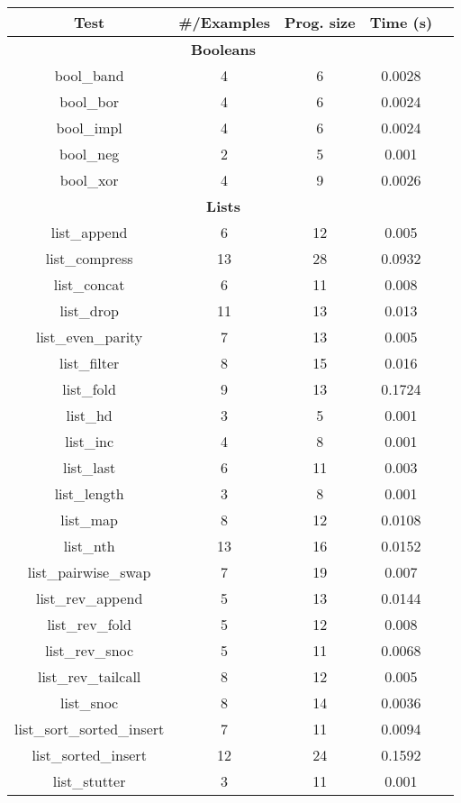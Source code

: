 \newcommand{\benchmarksCount}{ 42 }

\begin{table}
  \begin{center}
  \tabcolsep 5.8pt
  \footnotesize
  \begin{tabular}{ccccc}
  \hline
  \textbf{Test} & \textbf{ \#/Examples } & \textbf{ Prog. size } & \textbf{Time (s)} \\
  \hline

\multicolumn{4}{c}{\textbf{Booleans}} \\
bool\_band & 4 & 6 & 0.0028 \\
bool\_bor & 4 & 6 & 0.0024 \\
bool\_impl & 4 & 6 & 0.0024 \\
bool\_neg & 2 & 5 & 0.001 \\
bool\_xor & 4 & 9 & 0.0026 \\
\multicolumn{4}{c}{\textbf{Lists}} \\
list\_append & 6 & 12 & 0.005 \\
list\_compress & 13 & 28 & 0.0932 \\
list\_concat & 6 & 11 & 0.008 \\
list\_drop & 11 & 13 & 0.013 \\
list\_even\_parity & 7 & 13 & 0.005 \\
list\_filter & 8 & 15 & 0.016 \\
list\_fold & 9 & 13 & 0.1724 \\
list\_hd & 3 & 5 & 0.001 \\
list\_inc & 4 & 8 & 0.001 \\
list\_last & 6 & 11 & 0.003 \\
list\_length & 3 & 8 & 0.001 \\
list\_map & 8 & 12 & 0.0108 \\
list\_nth & 13 & 16 & 0.0152 \\
list\_pairwise\_swap & 7 & 19 & 0.007 \\
list\_rev\_append & 5 & 13 & 0.0144 \\
list\_rev\_fold & 5 & 12 & 0.008 \\
list\_rev\_snoc & 5 & 11 & 0.0068 \\
list\_rev\_tailcall & 8 & 12 & 0.005 \\
list\_snoc & 8 & 14 & 0.0036 \\
list\_sort\_sorted\_insert & 7 & 11 & 0.0094 \\
list\_sorted\_insert & 12 & 24 & 0.1592 \\
list\_stutter & 3 & 11 & 0.001 \\

\end{tabular}
\end{center}
\end{table}
